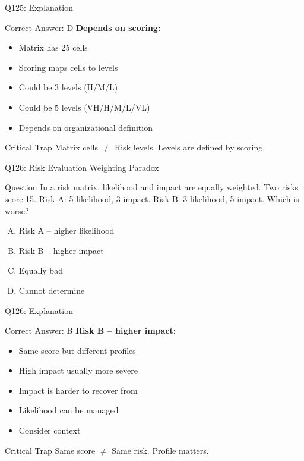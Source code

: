 \documentclass{beamer}
\begin{document}
	\begin{frame}{Q125: Explanation}
		\begin{block}{Correct Answer: D}
			\textbf{Depends on scoring:}
			\begin{itemize}
				\item Matrix has 25 cells
				\item Scoring maps cells to levels
				\item Could be 3 levels (H/M/L)
				\item Could be 5 levels (VH/H/M/L/VL)
				\item Depends on organizational definition
			\end{itemize}
		\end{block}
		\begin{alertblock}{Critical Trap}
			Matrix cells $\neq$ Risk levels. Levels are defined by scoring.
		\end{alertblock}
	\end{frame}
	
	\begin{frame}{Q126: Risk Evaluation Weighting Paradox}
		\begin{block}{Question}
			In a risk matrix, likelihood and impact are equally weighted. Two risks score 15. Risk A: 5 likelihood, 3 impact. Risk B: 3 likelihood, 5 impact. Which is worse?
		\end{block}
		\begin{enumerate}[(A)]
			\item Risk A -- higher likelihood
			\item Risk B -- higher impact
			\item Equally bad
			\item Cannot determine
		\end{enumerate}
	\end{frame}
	
	\begin{frame}{Q126: Explanation}
		\begin{block}{Correct Answer: B}
			\textbf{Risk B -- higher impact:}
			\begin{itemize}
				\item Same score but different profiles
				\item High impact usually more severe
				\item Impact is harder to recover from
				\item Likelihood can be managed
				\item Consider context
			\end{itemize}
		\end{block}
		\begin{alertblock}{Critical Trap}
			Same score $\neq$ Same risk. Profile matters.
		\end{alertblock}
	\end{frame}
	
\end{document}
